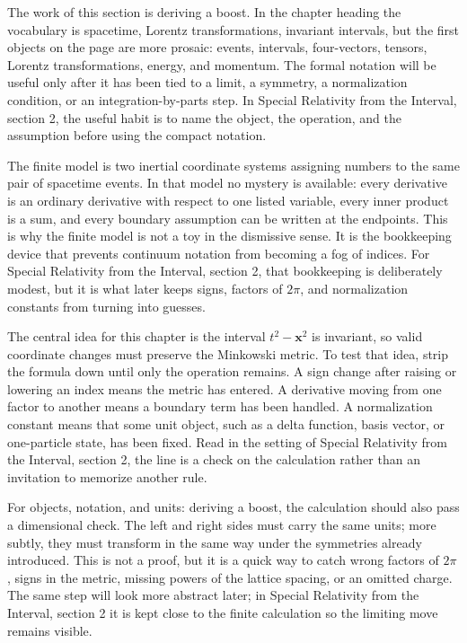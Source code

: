The work of this section is deriving a boost.  In the chapter heading the vocabulary is spacetime, Lorentz transformations, invariant intervals, but the first objects on the page are more prosaic: events, intervals, four-vectors, tensors, Lorentz transformations, energy, and momentum.  The formal notation will be useful only after it has been tied to a limit, a symmetry, a normalization condition, or an integration-by-parts step.  In Special Relativity from the Interval, section 2, the useful habit is to name the object, the operation, and the assumption before using the compact notation.

The finite model is two inertial coordinate systems assigning numbers to the same pair of spacetime events.  In that model no mystery is available: every derivative is an ordinary derivative with respect to one listed variable, every inner product is a sum, and every boundary assumption can be written at the endpoints.  This is why the finite model is not a toy in the dismissive sense.  It is the bookkeeping device that prevents continuum notation from becoming a fog of indices.  For Special Relativity from the Interval, section 2, that bookkeeping is deliberately modest, but it is what later keeps signs, factors of \(2\pi\), and normalization constants from turning into guesses.

The central idea for this chapter is the interval \(t^2-\bm x^2\) is invariant, so valid coordinate changes must preserve the Minkowski metric.  To test that idea, strip the formula down until only the operation remains.  A sign change after raising or lowering an index means the metric has entered.  A derivative moving from one factor to another means a boundary term has been handled.  A normalization constant means that some unit object, such as a delta function, basis vector, or one-particle state, has been fixed.  Read in the setting of Special Relativity from the Interval, section 2, the line is a check on the calculation rather than an invitation to memorize another rule.

For objects, notation, and units: deriving a boost, the calculation should also pass a dimensional check.  The left and right sides must carry the same units; more subtly, they must transform in the same way under the symmetries already introduced.  This is not a proof, but it is a quick way to catch wrong factors of \(2\pi\), signs in the metric, missing powers of the lattice spacing, or an omitted charge.  The same step will look more abstract later; in Special Relativity from the Interval, section 2 it is kept close to the finite calculation so the limiting move remains visible.

